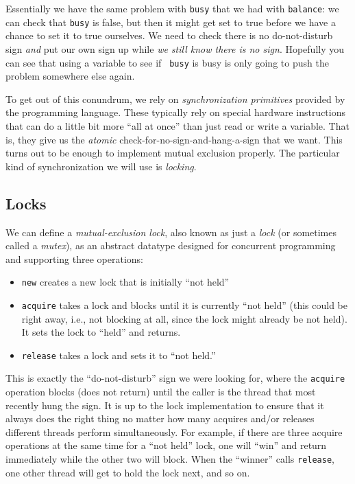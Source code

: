 \documentclass[10pt]{article}
\begin{document}
Essentially we have the same problem with {\tt busy} that we had with
{\tt balance}: we can check that {\tt busy} is false, but then it
might get set to true before we have a chance to set it to true
ourselves.  We need to check there is no do-not-disturb sign
\emph{and} put our own sign up while \emph{we still know there is no
  sign}.  Hopefully you can see that using a variable to see if {\tt
  busy} is busy is only going to push the problem somewhere else
again.

To get out of this conundrum, we rely on \emph{synchronization
  primitives} provided by the programming language.  These typically
rely on special hardware instructions that can do a little bit more
``all at once'' than just read or write a variable.  That is, they
give us the \emph{atomic} check-for-no-sign-and-hang-a-sign that we
want. This turns out to be enough to implement mutual exclusion
properly.  The particular kind of synchronization we will use is
\emph{locking}.

\subsection{Locks}
\label{sec:locks}

We can define a \emph{mutual-exclusion lock}, also known as just a
\emph{lock} (or sometimes called a \emph{mutex}), as an abstract
datatype designed for concurrent programming and supporting three
operations:
\begin{itemize}
\item {\tt new} creates a new lock that is initially ``not held''
\item {\tt acquire} takes a lock and blocks until it is currently
  ``not held'' (this could be right away, i.e., not blocking at all,
  since the lock might already be not held).  It sets the lock to
  ``held'' and returns.
\item {\tt release} takes a lock and sets it to ``not held.''
\end{itemize}
This is exactly the ``do-not-disturb'' sign we were looking for, where
the {\tt acquire} operation blocks (does not return) until the caller
is the thread that most recently hung the sign.  It is up to the lock
implementation to ensure that it always does the right thing no matter
how many acquires and/or releases different threads perform
simultaneously.  For example, if there are three acquire operations at
the same time for a ``not held'' lock, one will ``win'' and return
immediately while the other two will block.  When the ``winner'' calls
{\tt release}, one other thread will get to hold the lock next, and so on.
\end{document}
